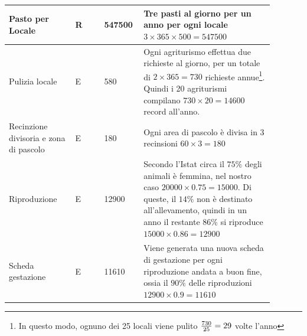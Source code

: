 \documentclass[12pt,a4paper]{article}
\begin{document}
\begin{center}
\begin{longtable}{|p{0.23\linewidth}|p{0.1\linewidth}|p{0.11\linewidth}|p{0.45\linewidth}|}
\hline
Pasto per Locale 				& \begin{center}
\vspace{-25pt}R
\end{center}
					& \begin{center}
					\vspace{-25pt}547500\end{center}
					&  Tre pasti al giorno per un anno per ogni locale $3\times365\times500=547500$ \\ 

\hline
Pulizia locale 				& \begin{center}
\vspace{-25pt}E
\end{center}
					& \begin{center}
					\vspace{-25pt}580\end{center}
					&  Ogni agriturismo effettua due richieste al giorno, per un totale di $2\times 365=730$ richieste annue\footnote{In questo modo, ognuno dei 25 locali viene pulito ${730\over 25}=29$ volte l'anno}. Quindi i 20 agriturismi compilano $730\times 20=14600$ record all'anno. \\ 

\hline
Recinzione divisoria e zona di pascolo 				& \begin{center}
\vspace{-25pt}E
\end{center}
					& \begin{center}
					\vspace{-25pt}180\end{center}
					&  Ogni area di pascolo è divisa in 3 recinsioni $60\times 3= 180$\\ 

\hline
Riproduzione 				& \begin{center}
\vspace{-25pt}E
\end{center}
					& \begin{center}
					\vspace{-25pt}12900\end{center}
					&  Secondo l'Istat circa il $75\%$ degli animali è femmina, nel nostro caso $20000\times0.75=15000$. Di queste, il $14\%$ non è destinato all'allevamento, quindi in un anno il restante $86\%$ si riproduce $15000\times 0.86=12900$ \\ 

\hline
Scheda gestazione 				& \begin{center}
\vspace{-25pt}E
\end{center}
					& \begin{center}
					\vspace{-25pt}11610\end{center}
					&  Viene generata una nuova scheda di gestazione per ogni riproduzione andata a buon fine, ossia il $90\%$ delle riproduzioni $12900\times 0.9= 11610$\\ 


\end{longtable}
\end{center}
\end{document}
